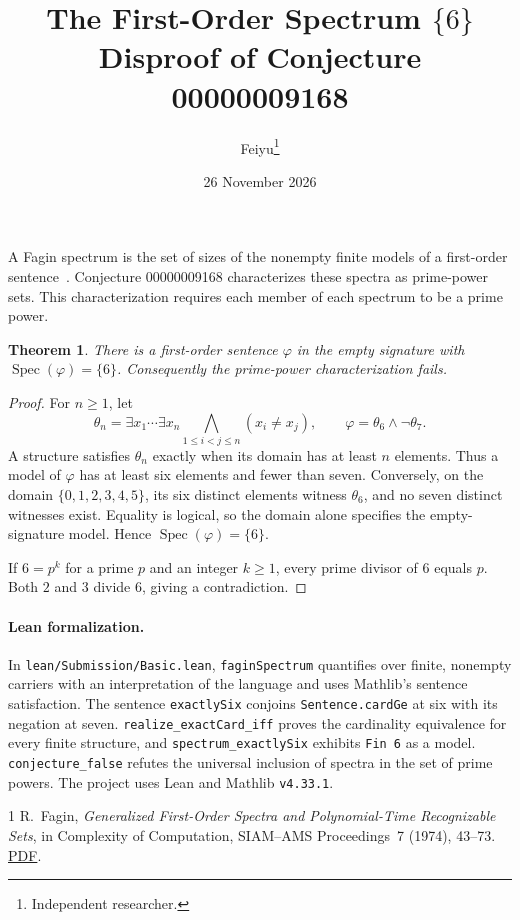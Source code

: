 \documentclass[11pt]{article}
\title{The First-Order Spectrum $\{6\}$\\
  \large Disproof of Conjecture 00000009168}
\author{Feiyu\thanks{Independent researcher.}}
\date{26 November 2026}
\DeclareMathOperator{\SpecFO}{Spec}
\newtheorem{theorem}{Theorem}
\begin{document}
\maketitle

A Fagin spectrum is the set of sizes of the nonempty finite models of a
first-order sentence~\cite[\S1]{fagin}. Conjecture 00000009168 characterizes
these spectra as prime-power sets. This characterization requires each
member of each spectrum to be a prime power.

\begin{theorem}
There is a first-order sentence $\varphi$ in the empty signature with
$\SpecFO(\varphi)=\{6\}$. Consequently the prime-power characterization fails.
\end{theorem}

\begin{proof}
For $n\ge 1$, let
\[
  \theta_n =
  \exists x_1\cdots\exists x_n
    \bigwedge_{1\le i<j\le n} (x_i\ne x_j),
  \qquad
  \varphi=\theta_6\land\neg\theta_7 .
\]
A structure satisfies $\theta_n$ exactly when its domain has at least $n$
elements. Thus a model of $\varphi$ has at least six elements and fewer than
seven. Conversely, on the domain $\{0,1,2,3,4,5\}$, its six distinct elements
witness $\theta_6$, and no seven distinct witnesses exist. Equality is
logical, so the domain alone specifies the empty-signature model. Hence
$\SpecFO(\varphi)=\{6\}$.

If $6=p^k$ for a prime $p$ and an integer $k\ge 1$, every prime divisor of
$6$ equals $p$. Both $2$ and $3$ divide $6$, giving a contradiction.
\end{proof}

\paragraph{Lean formalization.}
In \texttt{lean/Submission/Basic.lean}, \texttt{faginSpectrum} quantifies
over finite, nonempty carriers with an interpretation of the language and
uses Mathlib's sentence satisfaction. The sentence \texttt{exactlySix}
conjoins \texttt{Sentence.cardGe} at six with its negation at seven.
\texttt{realize\_exactCard\_iff} proves the cardinality equivalence for every
finite structure, and \texttt{spectrum\_exactlySix} exhibits \texttt{Fin 6}
as a model. \texttt{conjecture\_false} refutes the universal inclusion of
spectra in the set of prime powers. The project uses Lean and Mathlib
\texttt{v4.33.1}.

\begin{thebibliography}{1}
R.~Fagin, \emph{Generalized First-Order Spectra and Polynomial-Time
Recognizable Sets}, in Complexity of Computation, SIAM--AMS Proceedings~7
(1974), 43--73.
\href{https://www.cs.umd.edu/users/gasarch/COURSES/752/S26/slides/genspec.pdf}{PDF}.
\end{thebibliography}
\end{document}

